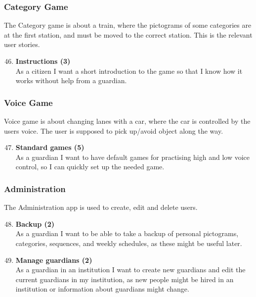 \subsubsection{Category Game}
The Category game is about a train, where the pictograms of some categories are at the first station, and must be moved to the correct station. This is the relevant user stories.

\begin{enumerate}
	\setcounter{enumi}{45} %
	\item \textbf{Instructions (3)}\\
	As a citizen I want a short introduction to the game so that I know how it works without help from a guardian.
\end{enumerate}

\subsubsection{Voice Game}
Voice game is about changing lanes with a car, where the car is controlled by the users voice. The user is supposed to pick up/avoid object along the way.

\begin{enumerate}
	\setcounter{enumi}{46} %
	\item \textbf{Standard games (5)}\\
	As a guardian I want to have default games for practising high and low voice control, so I can quickly set up the needed game.
\end{enumerate}

\subsubsection{Administration}
The Administration app is used to create, edit and delete users.

\begin{enumerate}
	\setcounter{enumi}{47} %
	\item \textbf{Backup (2)}\\
	As a guardian I want to be able to take a backup of personal pictograms, categories, sequences, and weekly schedules, as these might be useful later. 
	
	\item \textbf{Manage guardians (2)}\\
	As a guardian in an institution I want to create new guardians and edit the current guardians in my institution, as new people might be hired in an institution or information about guardians might change.
\end{enumerate}

